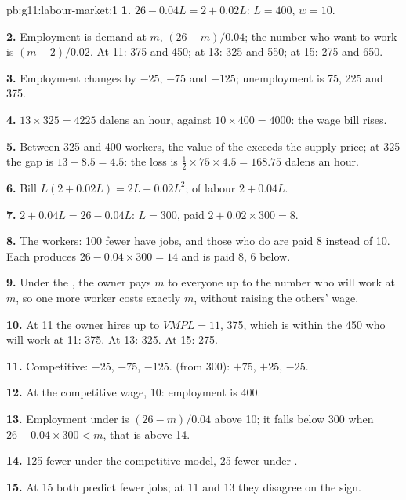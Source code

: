 \begin{solution}{pb:g11:labour-market:1}
\textbf{1.} $26 - 0.04L = 2 + 0.02L$: $L = 400$, $w = 10$.

\textbf{2.} Employment is demand at $m$, $(26 - m)/0.04$; the number who want to work is $(m - 2)/0.02$. At 11: 375 and 450; at 13: 325 and 550; at 15: 275 and 650.

\textbf{3.} Employment changes by $-25$, $-75$ and $-125$; unemployment is 75, 225 and 375.

\textbf{4.} $13 \times 325 = 4225$ dalens an hour, against $10 \times 400 = 4000$: the wage bill rises.

\textbf{5.} Between 325 and 400 workers, the value of the  exceeds the supply price; at 325 the gap is $13 - 8.5 = 4.5$: the loss is $\tfrac12 \times 75 \times
4.5 = 168.75$ dalens an hour.

\textbf{6.} Bill $L(2 + 0.02L) = 2L + 0.02L^2$;  of labour $2 + 0.04L$.

\textbf{7.} $2 + 0.04L = 26 - 0.04L$: $L = 300$, paid $2 + 0.02 \times 300 = 8$.

\textbf{8.} The workers: 100 fewer have jobs, and those who do are paid 8 instead of 10. Each produces $26 - 0.04 \times 300 = 14$ and is paid 8, 6 below.

\textbf{9.} Under the , the owner pays $m$ to everyone up to the number who will work at $m$, so one more worker costs exactly $m$, without raising the others' wage.

\textbf{10.} At 11 the owner hires up to $\mathit{VMPL} = 11$, 375, which is within the 450 who will work at 11: 375. At 13: 325. At 15: 275.

\textbf{11.} Competitive: $-25$, $-75$, $-125$.  (from 300): $+75$, $+25$, $-25$.

\textbf{12.} At the competitive wage, 10: employment is 400.

\textbf{13.} Employment under  is $(26 - m)/0.04$ above 10; it falls below 300 when $26 - 0.04 \times 300 < m$, that is above 14.

\textbf{14.} 125 fewer under the competitive model, 25 fewer under .

\textbf{15.} At 15 both predict fewer jobs; at 11 and 13 they disagree on the sign.


\end{solution}
